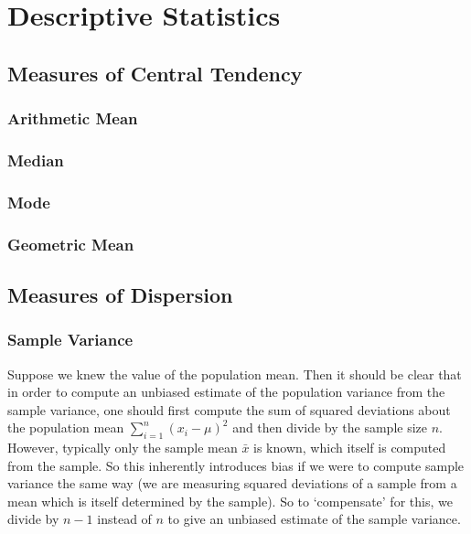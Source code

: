 \documentclass[11pt]{report} %
\begin{document}
\section{Descriptive Statistics}

\subsection{Measures of Central Tendency}

\subsubsection{Arithmetic Mean}

\subsubsection{Median}

\subsubsection{Mode}

\subsubsection{Geometric Mean}

\subsection{Measures of Dispersion}

\subsubsection{Sample Variance}

Suppose we knew the value of the population mean. Then it should be clear that in order to compute an unbiased estimate of the population variance from the sample variance, one should first compute the sum of squared deviations about the population mean $\sum_{i = 1}^{n}{\left(x_{i} - \mu\right)^{2}}$ and then divide by the sample size $n$. However, typically only the sample mean $\bar{x}$ is known, which itself is computed from the sample. So this inherently introduces bias if we were to compute sample variance the same way (we are measuring squared deviations of a sample from a mean which is itself determined by the sample). So to `compensate' for this, we divide by $n - 1$ instead of $n$ to give an unbiased estimate of the sample variance.
\end{document}
